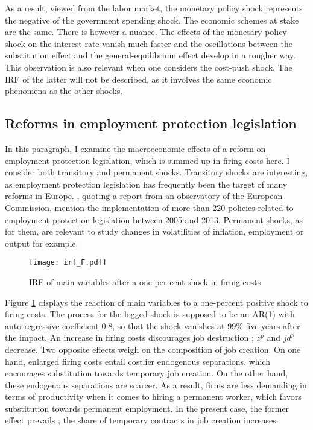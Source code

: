 As a result, viewed from the labor market, the monetary policy shock represents the negative of the government spending shock. The economic schemes at stake are the same. There is however a nuance. The effects of the monetary policy shock on the interest rate vanish much faster and the oscillations between the substitution effect and the general-equilibrium effect develop in a rougher way. This observation is also relevant when one considers the cost-push shock. The IRF of the latter will not be described, as it involves the same economic phenomena as the other shocks.

\subsection{Reforms in employment protection legislation}

In this paragraph, I examine the macroeconomic effects of a reform on employment protection legislation, which is summed up in firing costs here. I consider both transitory and permanent shocks. Transitory shocks are interesting, as employment protection legislation has frequently been the target of many reforms in Europe. \citet{fontaine2016cdd}, quoting a report from an observatory of the European Commission, mention the implementation of more than 220 policies related to employment protection legislation between 2005 and 2013. Permanent shocks, as for them, are relevant to study changes in volatilities of inflation, employment or output for example.

\begin{figure}[t]
\texttt{[image: irf\_F.pdf]}
\caption{IRF of main variables after a one-per-cent shock in firing costs}
\label{IRF_F}
\end{figure}

Figure \ref{IRF_F} displays the reaction of main variables to a one-percent positive shock to firing costs. The process for the logged shock is supposed to be an AR(1) with auto-regressive coefficient 0.8, so that the shock vanishes at 99\% five years after the impact. An increase in firing costs discourages job destruction ; $z^p$ and $jd^p$ decrease. Two opposite effects weigh on the composition of job creation. On one hand, enlarged firing costs entail costlier endogenous separations, which encourages substitution towards temporary job creation. On the other hand, these endogenous separations are scarcer. As a result, firms are less demanding in terms of productivity when it comes to hiring a permanent worker, which favors substitution towards permanent employment. In the present case, the former effect prevails ;  the share of temporary contracts in job creation increases.

